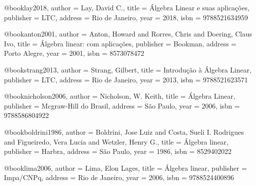 
%

@book{lay2018,
  author = {Lay, David C.},
  title = {Álgebra Linear e suas aplicações},
  publisher = {LTC},
  address = {Rio de Janeiro},
  year = {2018},
  isbn = {9788521634959}
}

@book{anton2001,
  author = {Anton, Howard and Rorres, Chris and Doering, Claus Ivo},
  title = {Álgebra linear: com aplicações},
  publisher = {Bookman},
  address = {Porto Alegre},
  year = {2001}, %
  isbn = {8573078472}%
}

@book{strang2013,
  author = {Strang, Gilbert},
  title = {Introdução à Álgebra Linear},
  publisher = {LTC},
  address = {Rio de Janeiro},
  year = {2013},
  isbn = {9788521623571}
}

@book{nicholson2006,
  author = {Nicholson, W. Keith},
  title = {Álgebra Linear},
  publisher = {Mcgraw-Hill do Brasil},
  address = {São Paulo},
  year = {2006},
  isbn = {9788586804922}
}

@book{boldrini1986,
  author = {Boldrini, Jose Luiz and Costa, Sueli I. Rodrigues and Figueiredo, Vera Lucia and Wetzler, Henry G.},
  title = {Álgebra linear},
  publisher = {Harbra},
  address = {São Paulo},
  year = {1986},
  isbn = {8529402022}%
}

@book{lima2006,
  author = {Lima, Elon Lages},
  title = {Álgebra linear},
  publisher = {Impa/CNPq},
  address = {Rio de Janeiro},
  year = {2006},
  isbn = {9788524400896}
}

